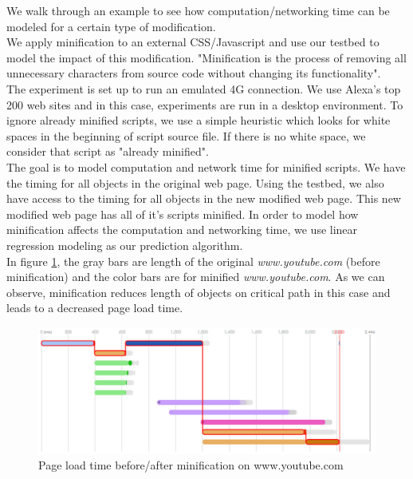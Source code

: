 \noindent We walk through an example to see how computation/networking time can be modeled for a certain type of modification.\\
We apply minification to an external CSS/Javascript and use our testbed to model the impact of this modification. "Minification is the process of removing all unnecessary characters from source code without changing its functionality"\cite{wiki_minification}. \\
The experiment is set up to run an emulated 4G connection. We use Alexa's top 200 web sites and in this case, experiments are run in a desktop environment.
To ignore already minified scripts, we use a simple heuristic which looks for white spaces in the beginning of script source file. If there is no white space, we consider that script as "already minified".\\
The goal is to model computation and network time for minified scripts. We have the timing for all objects in the original web page. Using the testbed, we also have access to the timing for all objects in the new modified web page. This new modified web page has all of it's scripts minified. In order to model how minification affects the computation and networking time, we use linear regression modeling as our prediction algorithm.\\
\noindent In figure \ref{fig:afterbeforeoncp}, the gray bars are length of the original {\em www.youtube.com} (before minification) and the color bars are for minified {\em www.youtube.com}. As we can observe, minification reduces length of objects on critical path in this case and leads to a decreased page load time.
\begin{figure}[!htb]
  \centering
    \includegraphics[width=0.85 \textwidth]{./figures/optimization/afterbeforeoncp.pdf}
  \caption {Page load time before/after minification on www.youtube.com}
  \label{fig:afterbeforeoncp}
\end{figure}

